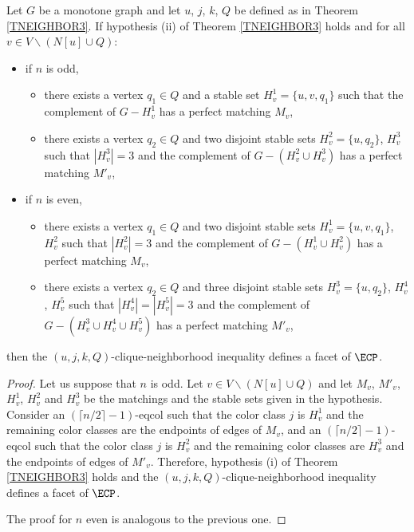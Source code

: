 \begin{tcor} \label{TNEIGHBOR3COR}
Let $G$ be a monotone graph and let $u$, $j$, $k$, $Q$ be defined as in Theorem \ref{TNEIGHBOR3}.
If hypothesis (ii) of Theorem \ref{TNEIGHBOR3} holds and for all $v \in V \backslash (N[u] \cup Q)$:
\begin{itemize}
\item if $n$ is odd,
\begin{itemize}
\item there exists a vertex $q_1 \in Q$ and a stable set $H^1_v = \{u, v, q_1\}$ such that the complement of $G - H^1_v$
has a perfect matching $M_v$,
\item there exists a vertex $q_2 \in Q$ and two disjoint stable sets $H^2_v = \{u, q_2\}$, $H^3_v$ such that
$|H^3_v| = 3$ and the complement of $G - (H^2_v \cup H^3_v)$ has a perfect matching  $M'_v$,
\end{itemize}
\item if $n$ is even,
\begin{itemize}
\item there exists a vertex $q_1 \in Q$ and two disjoint stable sets $H^1_v = \{u, v, q_1\}$, $H^2_v$ such that
$|H^2_v| = 3$ and the complement of $G - (H^1_v \cup H^2_v)$ has a perfect matching $M_v$,
\item there exists a vertex $q_2 \in Q$ and three disjoint stable sets $H^3_v = \{u, q_2\}$, $H^4_v$, $H^5_v$
such that $|H^4_v| = |H^5_v| = 3$ and the complement of $G - (H^3_v \cup H^4_v \cup H^5_v)$ has a perfect matching  $M'_v$,
\end{itemize}
\end{itemize}
then the $(u,j,k,Q)$-clique-neighborhood inequality defines a facet of $\ECP$.
\end{tcor}
\begin{proof}
Let us suppose that $n$ is odd.
Let $v \in V \backslash (N[u] \cup Q)$ and let $M_v$, $M'_v$, $H^1_v$, $H^2_v$ and $H^3_v$ be the matchings and the
stable sets given in the hypothesis. Consider an $(\lceil n/2 \rceil - 1)$-eqcol such that the color class
$j$ is $H^1_v$ and the remaining color classes are the endpoints of edges of $M_v$, and an
$(\lceil n/2 \rceil - 1)$-eqcol such that the color class $j$ is $H^2_v$ and the remaining color classes are $H^3_v$
and the endpoints of edges of $M'_v$. Therefore, hypothesis (i) of Theorem \ref{TNEIGHBOR3} holds and
the $(u,j,k,Q)$-clique-neighborhood inequality defines a facet of $\ECP$.

The proof for $n$ even is analogous to the previous one.
\end{proof}

